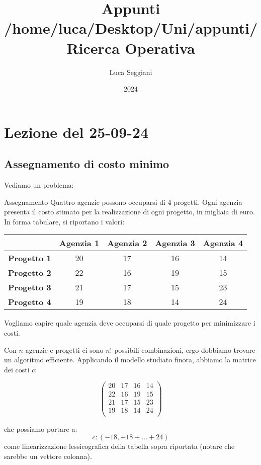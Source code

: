 \documentclass[a4paper,11pt]{article}
\title{Appunti /home/luca/Desktop/Uni/appunti/Ricerca Operativa}
\author{Luca Seggiani}
\date{2024}
\begin{document}
\section{Lezione del 25-09-24}

\thispagestyle{empty}
\pagestyle{fancy}

\subsection{Assegnamento di costo minimo}
Vediamo un problema:
\begin{problem}{Assegnamento}
	Quattro agenzie possono occuparsi di 4 progetti.
	Ogni agenzia presenta il costo stimato per la realizzazione di ogni progetto, in migliaia di euro.
	In forma tabulare, si riportano i valori:

	\center {}
	\begin{tabular} { | c | c | c | c | c | }
		\hline
		& \bfseries Agenzia 1 & \bfseries Agenzia 2 & \bfseries Agenzia 3 & \bfseries Agenzia 4 \\
		\hline 
		\bfseries Progetto 1 & 20 & 17 & 16 & 14 \\
		\bfseries Progetto 2 & 22 & 16 & 19 & 15 \\
		\bfseries Progetto 3 & 21 & 17 & 15 & 23 \\ 
		\bfseries Progetto 4 & 19 & 18 & 14 & 24 \\
		\hline
	\end{tabular}

	\par\bigskip
	\raggedright
	
	Vogliamo capire quale agenzia deve occuparsi di quale progetto per minimizzare i costi.

\end{problem}

Con $n$ agenzie e progetti ci sono $n!$ possibili combinazioni, ergo dobbiamo trovare un algoritmo efficiente. 
Applicando il modello studiato finora, abbiamo la matrice dei costi $c$:

$$
\begin{pmatrix}
 20 & 17 & 16 & 14 \\
 22 & 16 & 19 & 15 \\
 21 & 17 & 15 & 23 \\
 19 & 18 & 14 & 24 \\
\end{pmatrix}
$$

che possiamo portare a:
$$ c: ( -18, +18 + ... + 24 ) $$
come linearizzazione lessicografica della tabella sopra riportata (notare che sarebbe un vettore colonna).
\end{document}
